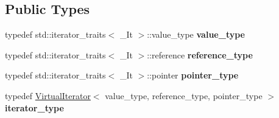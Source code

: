 \subsection*{Public Types}
\begin{DoxyCompactItemize}
\item 
typedef std\+::iterator\+\_\+traits$<$ \+\_\+\+It $>$\+::value\+\_\+type {\bfseries value\+\_\+type}\hypertarget{classAudio_1_1VirtualStandardIterator_aac222fa04d27c37967bd48dcbc2f05e3}{}\label{classAudio_1_1VirtualStandardIterator_aac222fa04d27c37967bd48dcbc2f05e3}

\item 
typedef std\+::iterator\+\_\+traits$<$ \+\_\+\+It $>$\+::reference {\bfseries reference\+\_\+type}\hypertarget{classAudio_1_1VirtualStandardIterator_a39dbb4292c6698d0654c09ecca803de6}{}\label{classAudio_1_1VirtualStandardIterator_a39dbb4292c6698d0654c09ecca803de6}

\item 
typedef std\+::iterator\+\_\+traits$<$ \+\_\+\+It $>$\+::pointer {\bfseries pointer\+\_\+type}\hypertarget{classAudio_1_1VirtualStandardIterator_a68f8b1803125dbf08521270f95b69c0c}{}\label{classAudio_1_1VirtualStandardIterator_a68f8b1803125dbf08521270f95b69c0c}

\item 
typedef \hyperlink{classAudio_1_1VirtualIterator}{Virtual\+Iterator}$<$ value\+\_\+type, reference\+\_\+type, pointer\+\_\+type $>$ {\bfseries iterator\+\_\+type}\hypertarget{classAudio_1_1VirtualStandardIterator_a8bc73f39ee2188eb4a19347c4a4f39a7}{}\label{classAudio_1_1VirtualStandardIterator_a8bc73f39ee2188eb4a19347c4a4f39a7}

\end{DoxyCompactItemize}
